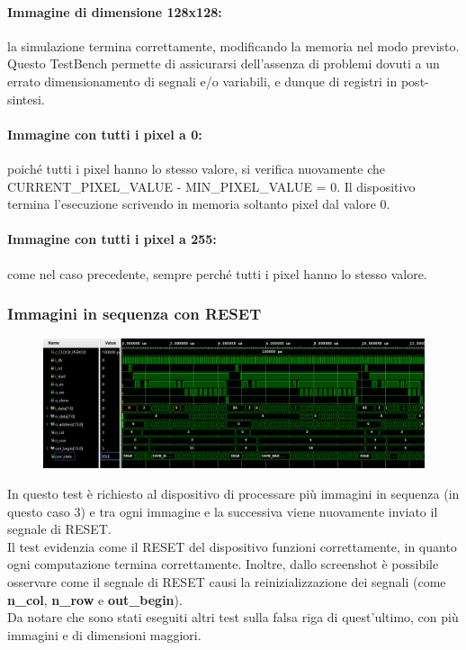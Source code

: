 \documentclass[a4paper, 12pt]{article}
\begin{document}
\paragraph*{Immagine di dimensione 128x128:}
la simulazione termina correttamente, modificando la memoria nel modo previsto.\\
Questo TestBench permette di assicurarsi dell'assenza di problemi dovuti a un errato dimensionamento di segnali e/o variabili, e dunque di registri in post-sintesi.
\paragraph*{Immagine con tutti i pixel a 0:}
poiché tutti i pixel hanno lo stesso valore, si verifica nuovamente che CURRENT\_PIXEL\_VALUE - MIN\_PIXEL\_VALUE = 0. Il dispositivo termina l'esecuzione scrivendo in memoria soltanto pixel dal valore 0.
\paragraph*{Immagine con tutti i pixel a 255:}
come nel caso precedente, sempre perché tutti i pixel hanno lo stesso valore. 

\subsubsection{Immagini in sequenza con RESET}
\begin{figure}[h]
    \centering
    \includegraphics[trim=0cm 1.25cm 0cm 0.25cm, width=1.0\textwidth]{simulazioni/GEN_RESET.png}
    \label{fig:gen_reset}
\end{figure}
In questo test è richiesto al dispositivo di processare più immagini in sequenza (in questo caso 3) e tra ogni immagine e la successiva viene nuovamente inviato il segnale di RESET. \\
Il test evidenzia come il RESET del dispositivo funzioni correttamente, in quanto ogni computazione termina correttamente. Inoltre, dallo screenshot è possibile osservare come il segnale di RESET causi la reinizializzazione dei segnali (come \textbf{n\_col}, \textbf{ n\_row} e \textbf{out\_begin}). \\
Da notare che sono stati eseguiti altri test sulla falsa riga di quest'ultimo, con più immagini e di dimensioni maggiori.
\end{document}
